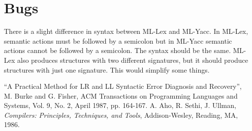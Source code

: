 \section{Bugs}

There is a slight difference in syntax between ML-Lex and ML-Yacc.
In ML-Lex, semantic actions must be followed by a semicolon but
in ML-Yacc semantic actions cannot be followed by a semicolon.
The syntax should be the same.  ML-Lex also produces structures with
two different signatures, but it should produce structures with just
one signature.  This would simplify some things.

\begin{thebibliography}{9}

 ``A Practical Method for LR and LL Syntactic Error
Diagnosis and Recovery'', M. Burke and G. Fisher,
ACM Transactions on Programming Languages and
Systems, Vol. 9, No. 2, April 1987, pp. 164-167.
 A. Aho, R. Sethi, J. Ullman, {\em Compilers: Principles,
Techniques, and Tools}, Addison-Wesley, Reading, MA, 1986.

\end{thebibliography}


